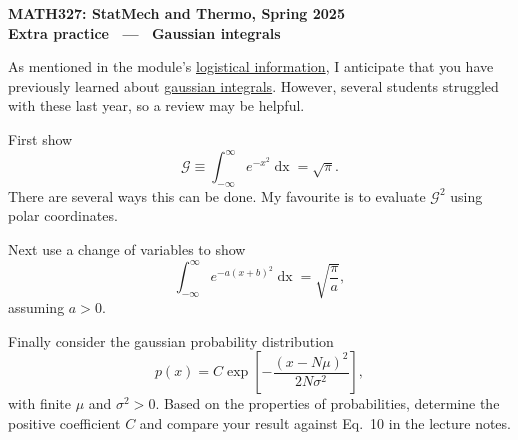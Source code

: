 \documentclass[12 pt]{article} %
\newcommand{\cG}{\ensuremath{\mathcal G} }
\newcommand{\si}{\ensuremath{\sigma} }
\renewcommand{\d}[1]{\ensuremath{\mathop{d#1}} }
\begin{document}
\newcommand{\thisunit}{MATH327 Extra (Gaussian int.)}
\newcommand{\moddate}{Last modified 24 Jan.~2025}
\begin{center}
  {\Large \textbf{MATH327: StatMech and Thermo, Spring 2025}} \\[12 pt]
  {\Large \textbf{Extra practice \ --- \ Gaussian integrals}} \\[24 pt]
\end{center}

As mentioned in the module's \href{https://canvas.liverpool.ac.uk/courses/76365/files/12029982}{logistical information}, I anticipate that you have previously learned about \href{https://en.wikipedia.org/wiki/Gaussian_integral}{gaussian integrals}.
However, several students struggled with these last year, so a review may be helpful.

First show
\begin{equation*}
  \cG \equiv \int_{-\infty}^{\infty} e^{-x^2} \d{x} = \sqrt{\pi}.
\end{equation*}
There are several ways this can be done.  My favourite is to evaluate $\cG^2$ using polar coordinates.

Next use a change of variables to show
\begin{equation*}
  \int_{-\infty}^{\infty} e^{-a (x + b)^2} \d{x} = \sqrt{\frac{\pi}{a}},
\end{equation*}
assuming $a > 0$.

Finally consider the gaussian probability distribution
\begin{equation*}
  p(x) = C \exp\left[-\frac{(x - N\mu)^2}{2N\si^2}\right],
\end{equation*}
with finite $\mu$ and $\si^2 > 0$.
Based on the properties of probabilities, determine the positive coefficient $C$ and compare your result against Eq.~10 in the lecture notes.
\end{document}
